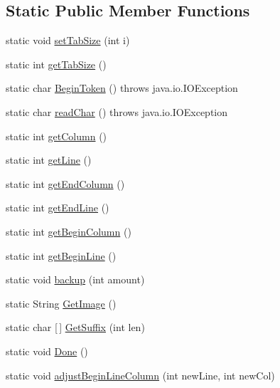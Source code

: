\subsection*{Static Public Member Functions}
\begin{DoxyCompactItemize}
\item 
static void \mbox{\hyperlink{classorg_1_1tec_1_1comp_1_1interpreter_1_1_simple_char_stream_a40b65b766b6e674164aaceef6ac2a9d7}{set\+Tab\+Size}} (int i)
\item 
static int \mbox{\hyperlink{classorg_1_1tec_1_1comp_1_1interpreter_1_1_simple_char_stream_afd71cf9392888734ed2c2170273fcaf0}{get\+Tab\+Size}} ()
\item 
static char \mbox{\hyperlink{classorg_1_1tec_1_1comp_1_1interpreter_1_1_simple_char_stream_a1627179d0e69c99dea1ee8608655a523}{Begin\+Token}} ()  throws java.\+io.\+I\+O\+Exception   
\item 
static char \mbox{\hyperlink{classorg_1_1tec_1_1comp_1_1interpreter_1_1_simple_char_stream_acfd21441d45c19f94d14d83a3521464c}{read\+Char}} ()  throws java.\+io.\+I\+O\+Exception   
\item 
static int \mbox{\hyperlink{classorg_1_1tec_1_1comp_1_1interpreter_1_1_simple_char_stream_a9551dc99ce6ef97eb9c848e7e4a6685a}{get\+Column}} ()
\item 
static int \mbox{\hyperlink{classorg_1_1tec_1_1comp_1_1interpreter_1_1_simple_char_stream_add3b2680e6ae39ed71962bdf4978fbe3}{get\+Line}} ()
\item 
static int \mbox{\hyperlink{classorg_1_1tec_1_1comp_1_1interpreter_1_1_simple_char_stream_a5420c4d6f3772d96dcae32e7293dceb8}{get\+End\+Column}} ()
\item 
static int \mbox{\hyperlink{classorg_1_1tec_1_1comp_1_1interpreter_1_1_simple_char_stream_a9cad3706737ddbb3fafdb9a1aaf50b6f}{get\+End\+Line}} ()
\item 
static int \mbox{\hyperlink{classorg_1_1tec_1_1comp_1_1interpreter_1_1_simple_char_stream_a21897a30847885ac7bd18958fb396835}{get\+Begin\+Column}} ()
\item 
static int \mbox{\hyperlink{classorg_1_1tec_1_1comp_1_1interpreter_1_1_simple_char_stream_a05c3c1a849ab4087b76d162d0291d687}{get\+Begin\+Line}} ()
\item 
static void \mbox{\hyperlink{classorg_1_1tec_1_1comp_1_1interpreter_1_1_simple_char_stream_a1f994cbbb9e8b08aa39f0bb73f911969}{backup}} (int amount)
\item 
static String \mbox{\hyperlink{classorg_1_1tec_1_1comp_1_1interpreter_1_1_simple_char_stream_a6fc134235f7fe501901ee9114bb2624a}{Get\+Image}} ()
\item 
static char \mbox{[}$\,$\mbox{]} \mbox{\hyperlink{classorg_1_1tec_1_1comp_1_1interpreter_1_1_simple_char_stream_a6ffe7865f8cf930dbee140a576eceab7}{Get\+Suffix}} (int len)
\item 
static void \mbox{\hyperlink{classorg_1_1tec_1_1comp_1_1interpreter_1_1_simple_char_stream_a6b07ec5c8bea5e54f4e84493f00b2466}{Done}} ()
\item 
static void \mbox{\hyperlink{classorg_1_1tec_1_1comp_1_1interpreter_1_1_simple_char_stream_ad6d4d9937042cbad99f843c88ba67804}{adjust\+Begin\+Line\+Column}} (int new\+Line, int new\+Col)
\end{DoxyCompactItemize}
